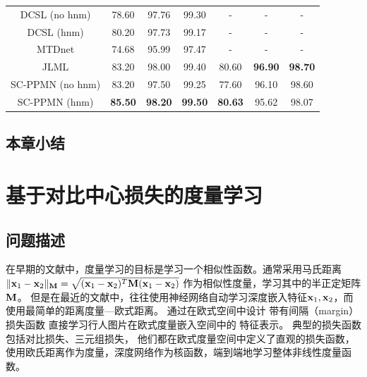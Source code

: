 \begin{table}
\begin{tabular}{c|ccc|ccc}
		DCSL (no hnm)                        & 78.60          & 97.76          & 99.30          & -              & -              & -              \\
		DCSL (hnm)                           & 80.20          & 97.73          & 99.17          & -              & -              & -              \\
		MTDnet                               & 74.68          & 95.99          & 97.47          & -              & -              & -              \\
		JLML                                 & 83.20          & 98.00          & 99.40          & 80.60          & \textbf{96.90} & \textbf{98.70} \\ \hline
		SC-PPMN (no hnm)                     & 83.20          & 97.50          & 99.25          & 77.60          & 96.10          & 98.60          \\
		SC-PPMN (hnm)                        & \textbf{85.50} & \textbf{98.20} & \textbf{99.50} & \textbf{80.63} & 95.62          & 98.07          \\
		\bottomrule
	\end{tabular}

	\label{table:CUHK03}
\end{table}

\section{本章小结}

\chapter{基于对比中心损失的度量学习}

\section{问题描述}

在早期的文献中，度量学习的目标是学习一个相似性函数。通常采用马氏距离
$\Vert {\mathbf{x}}_1 - {\mathbf{x}}_2\Vert_{\mathbf{M}}=
\sqrt{({\mathbf{x}}_1-{\mathbf{x}}_2)^T {\mathbf{M}} ({\mathbf{x}}_1 - {\mathbf{x}}_2) }$
作为相似性度量，学习其中的半正定矩阵${\mathbf{M}}$。
但是在最近的文献中，往往使用神经网络自动学习深度嵌入特征${\mathbf{x}}_1, {\mathbf{x}}_2$，而使用最简单的距离度量---欧式距离。
通过在欧式空间中设计
带有间隔（margin）损失函数
直接学习行人图片在欧式度量嵌入空间中的
特征表示。
典型的损失函数包括对比损失、三元组损失，
他们都在欧式度量空间中定义了直观的损失函数，使用欧氏距离作为度量，深度网络作为核函数，端到端地学习整体非线性度量函数。

